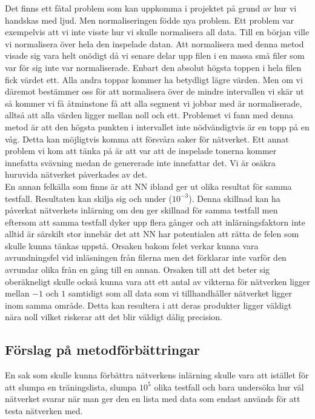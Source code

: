 \documentclass[a4paper,10pt]{article}
\begin{document}
Det finns ett fåtal problem som kan uppkomma i projektet på grund av hur vi handskas med ljud. 
Men normaliseringen födde nya problem. Ett problem var exempelvis att vi inte visste hur vi skulle normalisera all data. Till en början ville vi normalisera över hela den inspelade datan. Att normalisera med denna metod visade sig vara helt onödigt då vi senare delar upp filen i en massa små filer som var för sig inte var normaliserade. Enbart den absolut högsta toppen i hela filen fick värdet ett. Alla andra toppar kommer ha betydligt lägre värden. Men om vi däremot bestämmer oss för att normalisera över de mindre intervallen vi skär ut så kommer vi få åtminstone få att alla segment vi jobbar med är normaliserade, alltså att alla värden ligger mellan noll och ett. Problemet vi fann med denna metod är att den högsta punkten i intervallet inte nödvändigtvis är en topp på en våg. Detta kan möjligtvis komma att försvåra saker för nätverket. 
Ett annat problem vi kom att tänka på är att var att de inspelade tonerna kommer innefatta svävning medan de genererade inte innefattar det. Vi är osäkra huruvida nätverket påverkades av det. \\ 


En annan felkälla som finns är att NN ibland ger ut olika resultat för samma testfall. Resultaten kan skilja sig och under ($10^{-3}$). Denna skillnad kan ha påverkat nätverkets inlärning om den ger skillnad för samma testfall men eftersom att samma testfall dyker upp flera gånger och att inlärningsfaktorn inte alltid är särskilt stor innebär det att NN har potentialen att rätta de felen som skulle kunna tänkas uppstå. Orsaken bakom felet verkar kunna vara avrundningsfel vid inläsningen från filerna men det förklarar inte varför den avrundar olika från en gång till en annan. Orsaken till att det beter sig oberäkneligt skulle också kunna vara att ett antal av vikterna för nätverken ligger mellan $-1$ och $1$ samtidigt som all data som vi tillhandhåller nätverket ligger inom samma område. Detta kan resultera i att deras produkter ligger väldigt nära noll vilket riskerar att det blir väldigt dålig precision. 

\subsection{Förslag på metodförbättringar}

En sak som skulle kunna förbättra nätverkens inlärning skulle vara att istället för att slumpa en träningslista, slumpa $10^5$ olika testfall och bara undersöka hur väl nätverket svarar när man ger den en lista med data som endast används för att testa nätverken med. 
\end{document}
